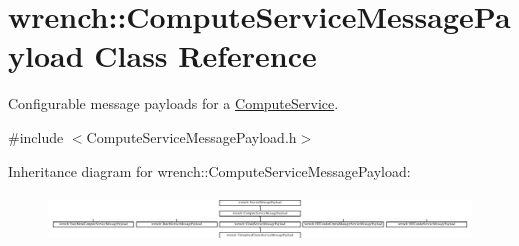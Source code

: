 \hypertarget{classwrench_1_1_compute_service_message_payload}{}\section{wrench\+:\+:Compute\+Service\+Message\+Payload Class Reference}
\label{classwrench_1_1_compute_service_message_payload}


Configurable message payloads for a \hyperlink{classwrench_1_1_compute_service}{Compute\+Service}.  




{\ttfamily \#include $<$Compute\+Service\+Message\+Payload.\+h$>$}

Inheritance diagram for wrench\+:\+:Compute\+Service\+Message\+Payload\+:\begin{figure}[H]
\begin{center}
\leavevmode
\includegraphics[height=1.247911cm]{classwrench_1_1_compute_service_message_payload}
\end{center}
\end{figure}
